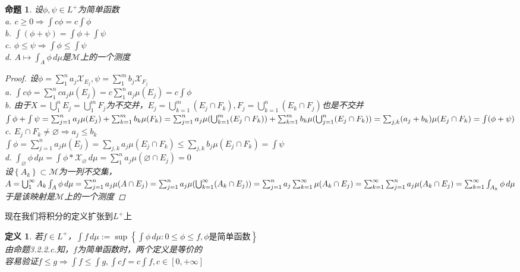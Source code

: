 \documentclass[12pt, a4paper, oneside]{ctexbook}
\newtheorem{definition}[theorem]{定义}
\newtheorem{proposition}[theorem]{命题}
\begin{document}
\begin{proposition}
    设$\phi,\psi\in L^+$为简单函数\\
    a. $c\geq 0\Rightarrow \int c\phi=c\int\phi$\\
    b. $\int(\phi+\psi)=\int\phi+\int\psi$\\
    c. $\phi\leq\psi\Rightarrow \int\phi\leq\int\psi$\\
    d. $A\mapsto \int_A\phi\,d\mu$是$\mathcal{M}$上的一个测度
    \begin{proof}
        设$\phi=\sum_1^na_j\mathcal{X}_{E_j},\psi=\sum_1^mb_j\mathcal{X}_{F_j}$\\
        a. $\int c\phi=\sum_1^n ca_j\mu(E_j)=c\sum_1^na_j\mu(E_j)=c\int\phi$\\
        b. 由于$X=\bigcup_1^n E_j=\bigcup_1^m F_j$为不交并，$E_j=\bigcup_{k=1}^m(E_j\cap F_k),F_j=\bigcup_{k=1}^n(E_k\cap 
        F_j)$也是不交并\\
        $\int\phi+\int\psi=\sum_{j=1}^na_j\mu(E_j)+\sum_{k=1}^mb_k\mu(F_k)\\
        =\sum_{j=1}^na_j\mu(\bigcup_{k=1}^m(E_j\cap F_k))+\sum_{k=1}^mb_k\mu(\bigcup_{j=1}^n(E_j\cap F_k))\\
        =\sum_{j,k}(a_j+b_k)\mu(E_j\cap F_k)\\
        =\int(\phi+\psi)$\\
        c. $E_j\cap F_k\neq\varnothing\Rightarrow a_j\leq b_k$\\
        $\int\phi=\sum_{j=1}^na_j\mu(E_j)=\sum_{j,k}a_j\mu(E_j\cap F_k)\leq\sum_{j,k}b_j\mu(E_j\cap F_k)=\int\psi$\\
        d. $\int_{\varnothing}\phi\,d\mu=\int\phi*\mathcal{X}_{\varnothing}\,d\mu=\sum_1^na_j\mu(\varnothing\cap E_j)=0$\\
        设$\left\{A_k\right\}\subset\mathcal{M}$为一列不交集，$A=\bigcup_1^{\infty} A_k\\
        \int_A\phi\,d\mu=\sum_{j=1}^na_j\mu(A\cap E_j)=\sum_{j=1}^na_j\mu(\bigcup_{k=1}^{\infty}(A_k\cap E_j))\\
        =\sum_{j=1}^na_j\sum_{k=1}^{\infty}\mu(A_k\cap E_j)\\
        =\sum_{k=1}^{\infty}\sum_{j=1}^na_j\mu(A_k\cap E_j)\\
        =\sum_{k=1}^{\infty}\int_{A_k}\phi\,d\mu$\\
        于是该映射是$\mathcal{M}$上的一个测度
    \end{proof}
\end{proposition}
现在我们将积分的定义扩张到$L^+$上
\begin{definition}
    若$f\in L^+$，$\int f\,d\mu:=\sup\left\{\int\phi\,d\mu:0\leq\phi\leq f,\phi\text{是简单函数}\right\}$\\
    由命题3.2.2.c.知，$f$为简单函数时，两个定义是等价的\\
    容易验证$f\leq g\Rightarrow \int f\leq\int g,\int cf=c\int f,c\in[0,+\infty]$
\end{definition}
\end{document}

